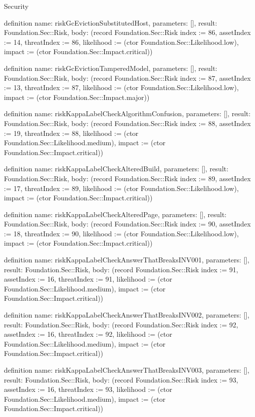 \begin{lexlean}{Security}
\begin{semanticmodule}
definition{
  name: riskGcEvictionSubstitutedHost,
  parameters: [],
  result: Foundation.Sec::Risk,
  body: (record Foundation.Sec::Risk {index := 86, assetIndex := 14, threatIndex := 86, likelihood := (ctor Foundation.Sec::Likelihood.low), impact := (ctor Foundation.Sec::Impact.critical)})
}

definition{
  name: riskGcEvictionTamperedModel,
  parameters: [],
  result: Foundation.Sec::Risk,
  body: (record Foundation.Sec::Risk {index := 87, assetIndex := 13, threatIndex := 87, likelihood := (ctor Foundation.Sec::Likelihood.low), impact := (ctor Foundation.Sec::Impact.major)})
}

definition{
  name: riskKappaLabelCheckAlgorithmConfusion,
  parameters: [],
  result: Foundation.Sec::Risk,
  body: (record Foundation.Sec::Risk {index := 88, assetIndex := 19, threatIndex := 88, likelihood := (ctor Foundation.Sec::Likelihood.medium), impact := (ctor Foundation.Sec::Impact.critical)})
}

definition{
  name: riskKappaLabelCheckAlteredBuild,
  parameters: [],
  result: Foundation.Sec::Risk,
  body: (record Foundation.Sec::Risk {index := 89, assetIndex := 17, threatIndex := 89, likelihood := (ctor Foundation.Sec::Likelihood.low), impact := (ctor Foundation.Sec::Impact.critical)})
}

definition{
  name: riskKappaLabelCheckAlteredPage,
  parameters: [],
  result: Foundation.Sec::Risk,
  body: (record Foundation.Sec::Risk {index := 90, assetIndex := 18, threatIndex := 90, likelihood := (ctor Foundation.Sec::Likelihood.low), impact := (ctor Foundation.Sec::Impact.critical)})
}

definition{
  name: riskKappaLabelCheckAnswerThatBreaksINV001,
  parameters: [],
  result: Foundation.Sec::Risk,
  body: (record Foundation.Sec::Risk {index := 91, assetIndex := 16, threatIndex := 91, likelihood := (ctor Foundation.Sec::Likelihood.medium), impact := (ctor Foundation.Sec::Impact.critical)})
}

definition{
  name: riskKappaLabelCheckAnswerThatBreaksINV002,
  parameters: [],
  result: Foundation.Sec::Risk,
  body: (record Foundation.Sec::Risk {index := 92, assetIndex := 16, threatIndex := 92, likelihood := (ctor Foundation.Sec::Likelihood.medium), impact := (ctor Foundation.Sec::Impact.critical)})
}

definition{
  name: riskKappaLabelCheckAnswerThatBreaksINV003,
  parameters: [],
  result: Foundation.Sec::Risk,
  body: (record Foundation.Sec::Risk {index := 93, assetIndex := 16, threatIndex := 93, likelihood := (ctor Foundation.Sec::Likelihood.medium), impact := (ctor Foundation.Sec::Impact.critical)})
}


\end{semanticmodule}
\end{lexlean}
